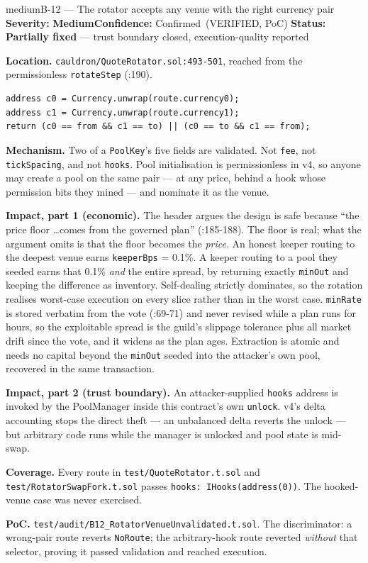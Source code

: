 \documentclass[11pt,a4paper]{article}
\newcommand{\SevMed}{\textcolor{medium}{\textbf{Medium}}}
\newcommand{\Conf}{\textcolor{critical}{Confirmed}}
\newcommand{\code}[1]{\texttt{\small #1}}
\newcommand{\fileref}[1]{\texttt{\scriptsize #1}}
\begin{document}
\begin{findingbox}{medium}{B-12 --- The rotator accepts any venue with the right currency pair}
\textbf{Severity:} \SevMed \quad \textbf{Confidence:} \Conf\ (VERIFIED, PoC) \quad
\textbf{Status:} \textcolor{medium}{\textbf{Partially fixed}} --- trust boundary closed,
execution-quality reported

\medskip
\textbf{Location.} \fileref{cauldron/QuoteRotator.sol:493-501}, reached from the
permissionless \code{rotateStep} (:190).

\begin{lstlisting}
address c0 = Currency.unwrap(route.currency0);
address c1 = Currency.unwrap(route.currency1);
return (c0 == from && c1 == to) || (c0 == to && c1 == from);
\end{lstlisting}

\textbf{Mechanism.} Two of a \code{PoolKey}'s five fields are validated. Not \code{fee},
not \code{tickSpacing}, and not \code{hooks}. Pool initialisation is permissionless in
v4, so anyone may create a pool on the same pair --- at any price, behind a hook whose
permission bits they mined --- and nominate it as the venue.

\textbf{Impact, part 1 (economic).} The header argues the design is safe because ``the
price floor \ldots comes from the governed plan'' (:185-188). The floor is real; what the
argument omits is that the floor becomes the \emph{price}. An honest keeper routing to the
deepest venue earns \code{keeperBps} = 0.1\%. A keeper routing to a pool they seeded earns
that 0.1\% \emph{and} the entire spread, by returning exactly \code{minOut} and keeping
the difference as inventory. Self-dealing strictly dominates, so the rotation realises
worst-case execution on every slice rather than in the worst case. \code{minRate} is
stored verbatim from the vote (:69-71) and never revised while a plan runs for hours, so
the exploitable spread is the guild's slippage tolerance plus all market drift since the
vote, and it widens as the plan ages. Extraction is atomic and needs no capital beyond the
\code{minOut} seeded into the attacker's own pool, recovered in the same transaction.

\textbf{Impact, part 2 (trust boundary).} An attacker-supplied \code{hooks} address is
invoked by the PoolManager inside this contract's own \code{unlock}. v4's delta accounting
stops the direct theft --- an unbalanced delta reverts the unlock --- but arbitrary code
runs while the manager is unlocked and pool state is mid-swap.

\textbf{Coverage.} Every route in \fileref{test/QuoteRotator.t.sol} and
\fileref{test/RotatorSwapFork.t.sol} passes \code{hooks: IHooks(address(0))}. The
hooked-venue case was never exercised.

\textbf{PoC.} \fileref{test/audit/B12\_RotatorVenueUnvalidated.t.sol}. The discriminator:
a wrong-pair route reverts \code{NoRoute}; the arbitrary-hook route reverted
\emph{without} that selector, proving it passed validation and reached execution.
\end{findingbox}
\end{document}
